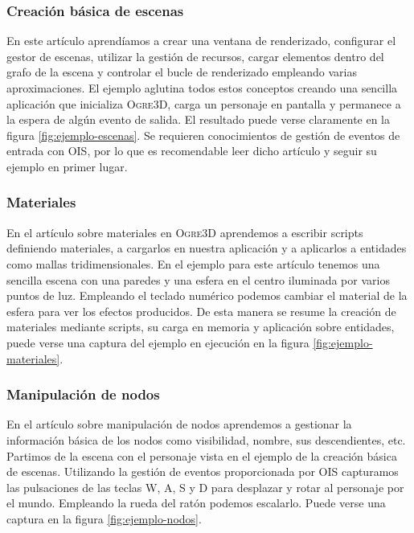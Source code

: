
\subsubsection{Creación básica de escenas}

En este artículo aprendíamos a crear una ventana de renderizado, configurar
el gestor de escenas, utilizar la gestión de recursos, cargar elementos
dentro del grafo de la escena y controlar el bucle de renderizado empleando
varias aproximaciones. El ejemplo aglutina todos estos conceptos creando
una sencilla aplicación que inicializa \textsc{Ogre3D}, carga un personaje
en pantalla y permanece a la espera de algún evento de salida. El resultado
puede verse claramente en la figura \ref{fig:ejemplo-escenas}. Se requieren
conocimientos de gestión de eventos de entrada con \textsc{OIS}, por lo que
es recomendable leer dicho artículo y seguir su ejemplo en primer lugar.\\


\subsubsection{Materiales}

En el artículo sobre materiales en \textsc{Ogre3D} aprendemos a escribir
scripts definiendo materiales, a cargarlos en nuestra aplicación y a aplicarlos
a entidades como mallas tridimensionales. En el ejemplo para este artículo
tenemos una sencilla escena con una paredes y una esfera en el centro iluminada
por varios puntos de luz. Empleando el teclado numérico podemos cambiar el material
de la esfera para ver los efectos producidos. De esta manera se resume la
creación de materiales mediante scripts, su carga en memoria y aplicación
sobre entidades, puede verse una captura del ejemplo en ejecución en la 
figura \ref{fig:ejemplo-materiales}.


\subsubsection{Manipulación de nodos}

En el artículo sobre manipulación de nodos aprendemos a gestionar la información
básica de los nodos como visibilidad, nombre, sus descendientes, etc.
Partimos de la escena con el personaje vista en el
ejemplo de la creación básica de escenas. Utilizando la gestión de eventos
proporcionada por \textsc{OIS} capturamos las pulsaciones de las teclas
W, A, S y D para desplazar y rotar al personaje por el mundo. Empleando
la rueda del ratón podemos escalarlo. Puede verse una captura en la figura
\ref{fig:ejemplo-nodos}.\\

